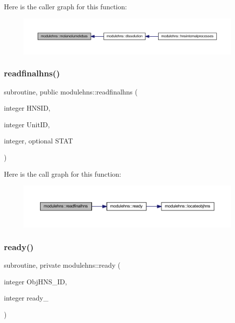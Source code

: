 Here is the caller graph for this function\+:\nopagebreak
\begin{figure}[H]
\begin{center}
\leavevmode
\includegraphics[width=350pt]{namespacemodulehns_a1d67c72bdca52544f6736edf0babb013_icgraph}
\end{center}
\end{figure}
\mbox{\label{namespacemodulehns_a41374dfc4d54eb48869c9b6727298941}} 
\subsubsection{\texorpdfstring{readfinalhns()}{readfinalhns()}}
{\footnotesize\ttfamily subroutine, public modulehns\+::readfinalhns (\begin{DoxyParamCaption}\item[{integer}]{H\+N\+S\+ID,  }\item[{integer}]{Unit\+ID,  }\item[{integer, optional}]{S\+T\+AT }\end{DoxyParamCaption})}

Here is the call graph for this function\+:\nopagebreak
\begin{figure}[H]
\begin{center}
\leavevmode
\includegraphics[width=350pt]{namespacemodulehns_a41374dfc4d54eb48869c9b6727298941_cgraph}
\end{center}
\end{figure}
\mbox{\label{namespacemodulehns_a1b4bda03d346568b51278fca35b05366}} 
\subsubsection{\texorpdfstring{ready()}{ready()}}
{\footnotesize\ttfamily subroutine, private modulehns\+::ready (\begin{DoxyParamCaption}\item[{integer}]{Obj\+H\+N\+S\+\_\+\+ID,  }\item[{integer}]{ready\+\_\+ }\end{DoxyParamCaption})\hspace{0.3cm}{\ttfamily [private]}}

